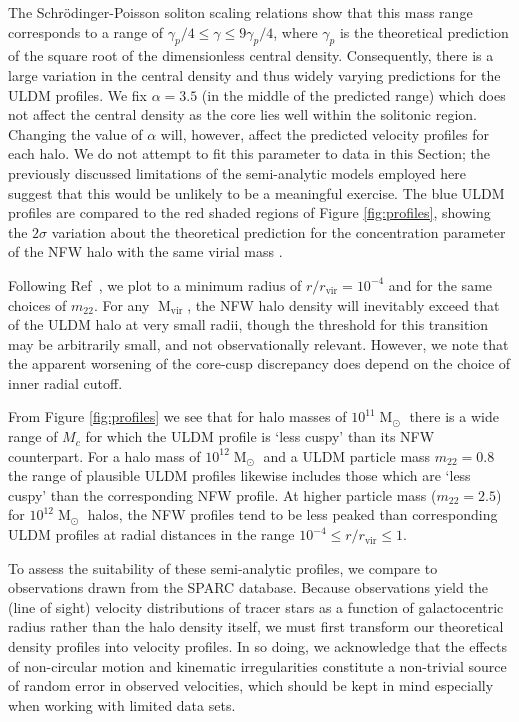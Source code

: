 \documentclass{pasa}%
\begin{document}
The  Schr{\"o}dinger-Poisson soliton scaling relations show that this mass range corresponds to a range of $ \gamma_p /4 \leq \gamma \leq 9\gamma_p/4$, where $\gamma_p$ is the theoretical prediction of the square root of the dimensionless central density. Consequently, there is a large variation in the central density and thus widely varying predictions for the ULDM profiles. We fix $\alpha = 3.5$ (in the middle of the predicted range) which does not affect the central density as the core lies well within the solitonic region. Changing the value of $\alpha$ will, however, affect the predicted velocity profiles for each halo. We do not attempt to fit this parameter to data in this Section; the previously discussed limitations of the semi-analytic models employed here suggest that this would be unlikely to be a meaningful exercise. The blue ULDM profiles are compared to the red shaded regions of Figure \ref{fig:profiles}, showing the $2\sigma$ variation about the theoretical prediction for the concentration parameter of the NFW halo with the same virial mass \cite{Maccio:2008pcd}. 


Following Ref~\cite{Robles:2018fur}, we plot to a minimum radius of $r/r_{\mathrm{vir}} = 10^{-4}$ and for the same choices of $m_{22}$. For any $\operatorname{M}_{\mathrm{vir}}$, the NFW halo density  will inevitably exceed that of the ULDM halo at very small radii, though the threshold for this transition may be arbitrarily small, and not observationally relevant. However, we note that the apparent worsening of the core-cusp discrepancy does depend on the choice of inner radial cutoff.

From Figure \ref{fig:profiles} we see that for halo masses of $10^{11}\operatorname{M}_{\odot}$ there is a wide range of $M_c$ for which the ULDM profile is `less cuspy' than its NFW counterpart. For a halo mass of $10^{12}\operatorname{M}_{\odot}$ and a ULDM particle mass $m_{22}=0.8$ the range of plausible ULDM profiles likewise includes those which are `less cuspy' than the corresponding NFW profile. At higher particle mass ($m_{22}=2.5$) for $10^{12}\operatorname{M}_{\odot}$ halos, the NFW profiles tend to be less peaked than corresponding ULDM profiles at radial distances in  the range $10^{-4}\leq r/r_{\mathrm{vir}} \leq 1$.  

To assess the suitability of these semi-analytic profiles, we compare to observations drawn from the SPARC database. Because observations yield the (line of sight) velocity distributions of tracer stars as a function of galactocentric radius rather than the halo density itself, we must first transform our theoretical density profiles into velocity profiles. In so doing, we acknowledge that the effects of non-circular motion and kinematic irregularities constitute a non-trivial source of random error in observed velocities, which should be kept in mind especially when working with limited data sets. 
\end{document}

